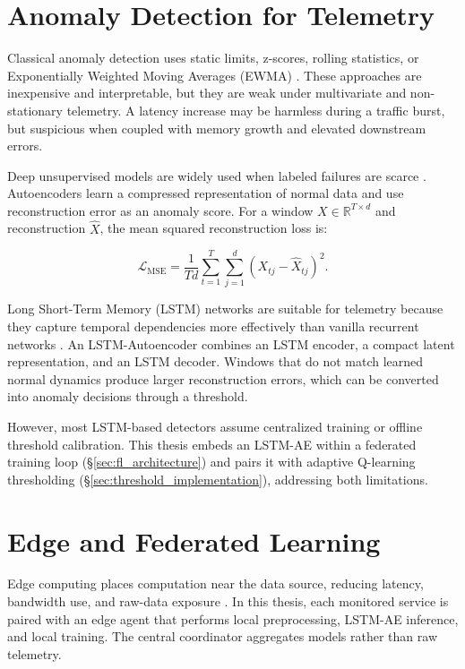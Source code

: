 \section{Anomaly Detection for Telemetry}
\label{sec:bg_anomaly}

Classical anomaly detection uses static limits, z-scores, rolling statistics, or
Exponentially Weighted Moving Averages (EWMA) \cite{basseville1993detection,
chandola2009anomaly}. These approaches are inexpensive and interpretable, but
they are weak under multivariate and non-stationary telemetry. A latency increase
may be harmless during a traffic burst, but suspicious when coupled with memory
growth and elevated downstream errors.

Deep unsupervised models are widely used when labeled failures are scarce
\cite{chalapathy2019deep, pang2021deep}. Autoencoders learn a compressed
representation of normal data and use reconstruction error as an anomaly score.
For a window $X \in \mathbb{R}^{T \times d}$ and reconstruction $\hat{X}$, the
mean squared reconstruction loss is:

\begin{equation}
    \mathcal{L}_{\text{MSE}} =
    \frac{1}{T d} \sum_{t=1}^{T}\sum_{j=1}^{d}
    \left(X_{tj} - \hat{X}_{tj}\right)^2 .
    \label{eq:bg_mse}
\end{equation}

Long Short-Term Memory (LSTM) networks are suitable for telemetry because they
capture temporal dependencies more effectively than vanilla recurrent networks
\cite{hochreiter1997long, malhotra2015lstm}. An LSTM-Autoencoder combines an
LSTM encoder, a compact latent representation, and an LSTM decoder. Windows that
do not match learned normal dynamics produce larger reconstruction errors, which
can be converted into anomaly decisions through a threshold.

However, most LSTM-based detectors assume centralized training or offline
threshold calibration. This thesis embeds an LSTM-AE within a federated
training loop (\S\ref{sec:fl_architecture}) and pairs it with adaptive
Q-learning thresholding (\S\ref{sec:threshold_implementation}), addressing
both limitations.

\section{Edge and Federated Learning}
\label{sec:bg_edge_fl}

Edge computing places computation near the data source, reducing latency,
bandwidth use, and raw-data exposure \cite{shi2016edge,
satyanarayanan2017emergence}. In this thesis, each monitored service is paired
with an edge agent that performs local preprocessing, LSTM-AE inference, and
local training. The central coordinator aggregates models rather than raw
telemetry.

